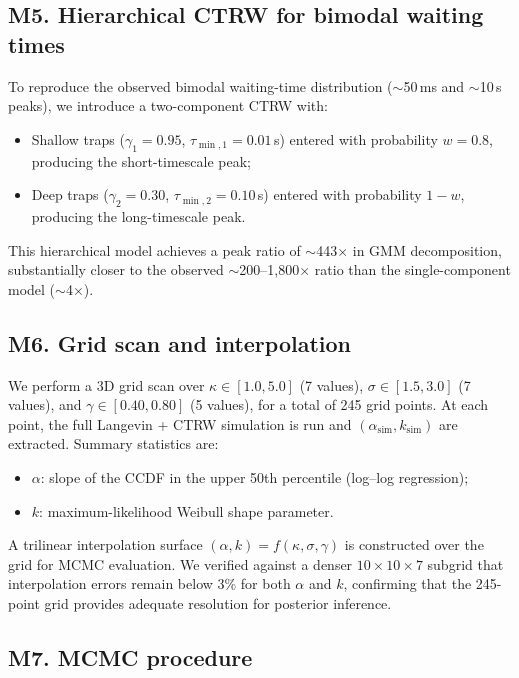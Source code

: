 \documentclass[twocolumn]{article}
\begin{document}
\subsection*{M5. Hierarchical CTRW for bimodal waiting times}

To reproduce the observed bimodal waiting-time distribution ($\sim$50\,ms and $\sim$10\,s peaks), we introduce a two-component CTRW with:
\begin{itemize}
\item Shallow traps ($\gamma_1 = 0.95$, $\tau_{\min,1} = 0.01$\,s) entered with probability $w = 0.8$, producing the short-timescale peak;
\item Deep traps ($\gamma_2 = 0.30$, $\tau_{\min,2} = 0.10$\,s) entered with probability $1-w$, producing the long-timescale peak.
\end{itemize}
This hierarchical model achieves a peak ratio of $\sim$443$\times$ in GMM decomposition, substantially closer to the observed $\sim$200--1{,}800$\times$ ratio than the single-component model ($\sim$4$\times$).

\subsection*{M6. Grid scan and interpolation}

We perform a 3D grid scan over $\kappa \in [1.0, 5.0]$ (7 values), $\sigma \in [1.5, 3.0]$ (7 values), and $\gamma \in [0.40, 0.80]$ (5 values), for a total of 245 grid points. At each point, the full Langevin + CTRW simulation is run and $(\alpha_{\mathrm{sim}}, k_{\mathrm{sim}})$ are extracted. Summary statistics are:
\begin{itemize}
\item $\alpha$: slope of the CCDF in the upper 50th percentile (log--log regression);
\item $k$: maximum-likelihood Weibull shape parameter.
\end{itemize}
A trilinear interpolation surface $(\alpha, k) = f(\kappa, \sigma, \gamma)$ is constructed over the grid for MCMC evaluation. We verified against a denser $10 \times 10 \times 7$ subgrid that interpolation errors remain below 3\% for both $\alpha$ and $k$, confirming that the 245-point grid provides adequate resolution for posterior inference.

\subsection*{M7. MCMC procedure}
\end{document}
